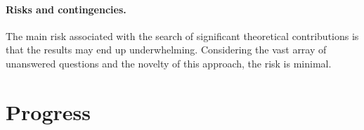 \documentclass{article}
\begin{document}
\paragraph{Risks and contingencies.} The main risk associated with the search of
significant theoretical contributions is that the results may end up
underwhelming. Considering the vast array of unanswered questions and the
novelty of this approach, the risk is minimal.

\section{Progress}







\end{document}
